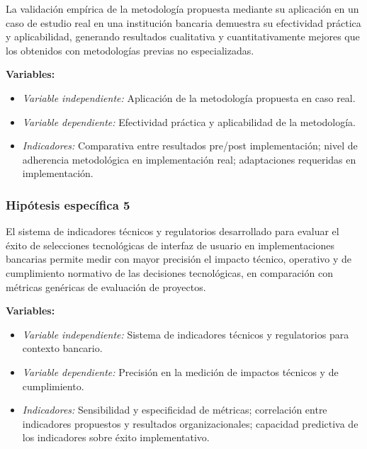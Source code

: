 La validación empírica de la metodología propuesta mediante su
        aplicación en un caso de estudio real en una institución bancaria
        demuestra su efectividad práctica y aplicabilidad, generando resultados
        cualitativa y cuantitativamente mejores que los obtenidos con
        metodologías previas no especializadas.

        \textbf{Variables:}
        \begin{itemize}
          \item \textit{Variable independiente:} Aplicación de la metodología
                propuesta en caso real.
          \item \textit{Variable dependiente:} Efectividad práctica y
                aplicabilidad de la metodología.
          \item \textit{Indicadores:} Comparativa entre resultados pre/post
                implementación; nivel de adherencia metodológica en
                implementación real; adaptaciones requeridas en
                implementación.
        \end{itemize}


\subsubsection{Hipótesis específica 5}

El sistema de indicadores técnicos y regulatorios desarrollado para
        evaluar el éxito de selecciones tecnológicas de interfaz de usuario en
        implementaciones bancarias permite medir con mayor precisión el
        impacto técnico, operativo y de cumplimiento normativo de las
        decisiones tecnológicas, en comparación con métricas genéricas de
        evaluación de proyectos.

        \textbf{Variables:}
        \begin{itemize}
          \item \textit{Variable independiente:} Sistema de indicadores
                técnicos y regulatorios para contexto bancario.
          \item \textit{Variable dependiente:} Precisión en la medición de
                impactos técnicos y de cumplimiento.
          \item \textit{Indicadores:} Sensibilidad y especificidad de métricas;
                correlación entre indicadores propuestos y resultados
                organizacionales; capacidad predictiva de los indicadores sobre
                éxito implementativo.
        \end{itemize}



